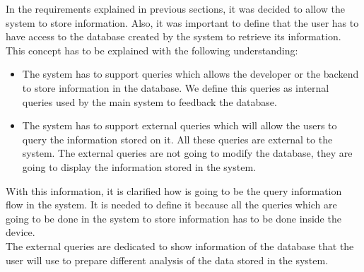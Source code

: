 In the requirements explained in previous sections, it was decided to allow the system to store information. Also, it was important to define that the user has to have access to the database created by the system to retrieve its information.\\

This concept has to be explained with the following understanding:

\begin{itemize}
\item The system has to support queries which allows the developer or the backend to store information in the database. We define this queries as internal queries used by the main system to feedback the database.
\item The system has to support external queries which will allow the users to query the information stored on it. All these queries are external to the system. The external queries are not going to modify the database, they are going to display the information stored in the system.
\end{itemize}

With this information, it is clarified how is going to be the query information flow in the system. It is needed to define it because all the queries which are going to be done in the system to store information has to be done inside the device.\\

The external queries are dedicated to show information of the database that the user will use to prepare different analysis of the data stored in the system.

\newpage


